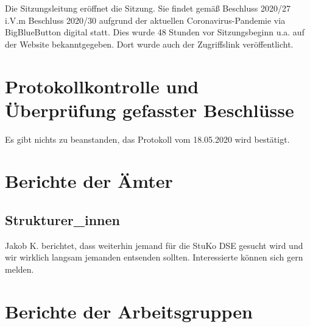 \documentclass{fsrprotokoll}
\begin{document}

\date{25.05.2020}  %
\excused{}
\unexcused{}

\maketitle

Die  Sitzungsleitung eröffnet die Sitzung. Sie findet gemäß Beschluss  2020/27 i.V.m Beschluss 2020/30 aufgrund der aktuellen  Coronavirus-Pandemie via BigBlueButton digital statt. Dies wurde 48 Stunden vor Sitzungsbeginn u.a. auf der Website bekanntgegeben. Dort wurde auch der Zugriffslink veröffentlicht.


\section{Protokollkontrolle und Überprüfung gefasster Beschlüsse}
Es gibt nichts zu beanstanden, das Protokoll vom 18.05.2020 wird bestätigt. 

\section{Berichte der Ämter}
\subsection{Strukturer\_innen}
Jakob K. berichtet, dass weiterhin jemand für die StuKo DSE gesucht wird und wir wirklich langsam jemanden entsenden sollten. Interessierte können sich gern melden.

\section{Berichte der Arbeitsgruppen}
\end{document}
